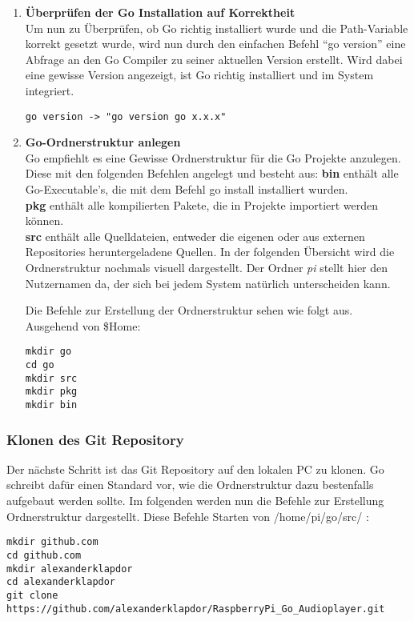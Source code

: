 \begin{enumerate}
\item \textbf{Überprüfen der Go Installation auf Korrektheit} \\
Um nun zu Überprüfen, ob Go richtig installiert wurde und die Path-Variable korrekt gesetzt wurde, wird nun durch den einfachen Befehl \enquote{go version} eine Abfrage an den Go Compiler zu seiner aktuellen Version erstellt. Wird dabei eine gewisse Version angezeigt, ist Go richtig installiert und im System integriert.
\begin{lstlisting}
go version -> "go version go x.x.x"
\end{lstlisting}

\item \textbf{Go-Ordnerstruktur anlegen} \\
Go empfiehlt es eine Gewisse Ordnerstruktur für die Go Projekte anzulegen. Diese mit den folgenden Befehlen angelegt und besteht aus:
\textbf{bin} enthält alle Go-Executable's, die mit dem Befehl go install installiert wurden. \\ 
\textbf{pkg} enthält alle kompilierten Pakete, die in Projekte importiert werden können. 
\\
\textbf{src} enthält alle Quelldateien, entweder die eigenen oder aus externen Repositories heruntergeladene Quellen. \newline
In der folgenden Übersicht wird die Ordnerstruktur nochmals visuell dargestellt.
Der Ordner \textit{pi} stellt hier den Nutzernamen da, der sich bei jedem System natürlich unterscheiden kann. \\
\begin{minipage}[t]{\textwidth}
Die Befehle zur Erstellung der Ordnerstruktur sehen wie folgt aus. \\
Ausgehend von \$Home:
\begin{lstlisting}[caption={Erstellung der Go Ordnerstruktur}]
mkdir go
cd go
mkdir src
mkdir pkg
mkdir bin
\end{lstlisting}
\end{minipage}


\end{enumerate}

\subsubsection{Klonen des Git Repository}
Der nächste Schritt ist das Git Repository auf den lokalen PC zu klonen. Go schreibt dafür einen Standard vor, wie die Ordnerstruktur dazu bestenfalls aufgebaut werden sollte. Im folgenden werden nun die Befehle zur Erstellung Ordnerstruktur dargestellt. 
Diese Befehle Starten von /home/pi/go/src/ :
\begin{lstlisting}[caption={Klonen des Git Repository}]
mkdir github.com 
cd github.com
mkdir alexanderklapdor
cd alexanderklapdor
git clone https://github.com/alexanderklapdor/RaspberryPi_Go_Audioplayer.git
\end{lstlisting}

